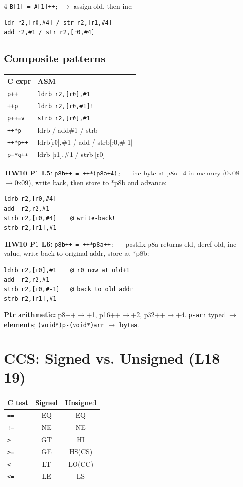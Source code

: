\documentclass[8pt,landscape]{extarticle}
\newcommand{\asm}[1]{\texttt{\scriptsize #1}}
\newcommand{\cee}[1]{\texttt{\scriptsize #1}}
\newenvironment{ex}
  {\par\smallskip\noindent{\scriptsize\color{red!55!black}\textbf{Ex.}}\,\scriptsize\ignorespaces}
  {\par}
\begin{document}
\begin{multicols*}{4}
\cee{B[1] = A[1]++;} $\to$ assign old, then inc:
\begin{lstlisting}
ldr r2,[r0,#4] / str r2,[r1,#4]
add r2,#1 / str r2,[r0,#4]
\end{lstlisting}

\subsection{Composite patterns}
\begin{tabular}{@{}ll@{}}
\toprule
C expr & ASM \\
\midrule
\cee{*p++}     & \asm{ldrb r2,[r0],\#1} \\
\cee{*++p}     & \asm{ldrb r2,[r0,\#1]!} \\
\cee{*p++=v}   & \asm{strb r2,[r0],\#1} \\
\cee{++*p}     & ldrb / add\#1 / strb \\
\cee{++*p++}   & ldrb[r0],\#1 / add / strb[r0,\#-1] \\
\cee{*p=*q++}  & ldrb [r1],\#1 / strb [r0] \\
\bottomrule
\end{tabular}

\begin{ex}\textbf{HW10 P1 L5:} \cee{*p8b++ = ++*(p8a+4);} --- inc byte at p8a+4 in memory (0x08$\to$0x09), write back, then store to *p8b and advance:
\begin{lstlisting}
ldrb r2,[r0,#4]
add  r2,r2,#1
strb r2,[r0,#4]    @ write-back!
strb r2,[r1],#1
\end{lstlisting}\end{ex}

\begin{ex}\textbf{HW10 P1 L6:} \cee{*p8b++ = ++*p8a++;} --- postfix p8a returns old, deref old, inc value, write back to original addr, store at *p8b:
\begin{lstlisting}
ldrb r2,[r0],#1    @ r0 now at old+1
add  r2,r2,#1
strb r2,[r0,#-1]   @ back to old addr
strb r2,[r1],#1
\end{lstlisting}\end{ex}

\textbf{Ptr arithmetic:} p8++$\to$+1, p16++$\to$+2, p32++$\to$+4. \cee{p-arr} typed $\to$ \textbf{elements}; \cee{(void*)p-(void*)arr} $\to$ \textbf{bytes}.

\section{CCS: Signed vs. Unsigned (L18--19)}
\begin{tabular}{@{}lcc@{}}
\toprule
C test & Signed & Unsigned \\
\midrule
\cee{==} & EQ & EQ \\
\cee{!=} & NE & NE \\
\cee{>}  & GT & HI \\
\cee{>=} & GE & HS(CS) \\
\cee{<}  & LT & LO(CC) \\
\cee{<=} & LE & LS \\
\bottomrule
\end{tabular}


\end{multicols*}
\end{document}
